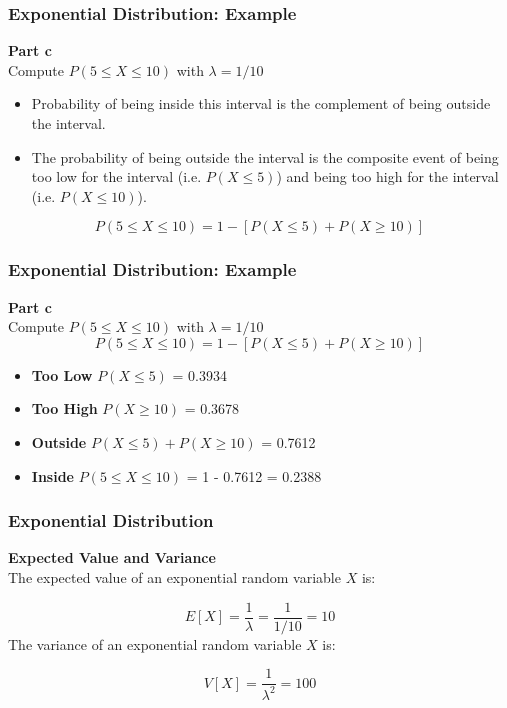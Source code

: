 \documentclass[IntroMain.tex]{subfiles}
\begin{document}
\begin{frame}[fragile]
\frametitle{Exponential Distribution: Example}
\vspace{-1.0cm}
\Large
\textbf{Part c}\\

Compute $P(5 \leq X \leq 10)$ with $\lambda = 1/10$  \\
\vspace{0.3cm}
\begin{itemize}
\item Probability of being inside this interval is the complement of being outside the interval.
\item The probability of being outside the interval is the composite event of being too low for the interval (i.e. $P( X \leq 5)$)
and being too high for the interval (i.e. $P( X \leq 10)$).
\end{itemize}
\[ P(5 \leq X \leq 10) = 1 - \left[ P( X \leq 5) + P( X \geq 10)  \right] \]
\end{frame}

\begin{frame}[fragile]
\frametitle{Exponential Distribution: Example}
\vspace{-1.0cm}
\Large
\textbf{Part c}\\
Compute $P(5 \leq X \leq 10)$ with $\lambda = 1/10$ 
\vspace{0.1cm}
\[ P(5 \leq X \leq 10) = 1 - \left[ P( X \leq 5) + P( X \geq 10)  \right] \]
\vspace{-0.6cm}
\begin{itemize}
\item \textbf{Too Low} $P(X \leq 5)$ = 0.3934
\vspace{0.2cm}
\item \textbf{Too High} $P(X \geq 10)$ = 0.3678
\vspace{0.2cm}
\item \textbf{Outside} $P( X \leq 5) + P( X \geq 10)$ = 0.7612
\vspace{0.2cm}
\item \textbf{Inside} $P(5 \leq X \leq 10)$ = 1 - 0.7612 = 0.2388
\end{itemize}
\end{frame}

\begin{frame}[fragile]
\frametitle{Exponential Distribution}
\Large
\vspace{-1.0cm}
\textbf{Expected Value and Variance}\\
The expected value of an exponential random variable $X$ is:

\[
E[X] = \frac{1}{\lambda} = \frac{1}{1/10} = 10 \]
The variance of an exponential random variable $X$ is:

\[
V[X] = \frac{1}{\lambda^2} = 100\]

\end{frame}
\end{document}
